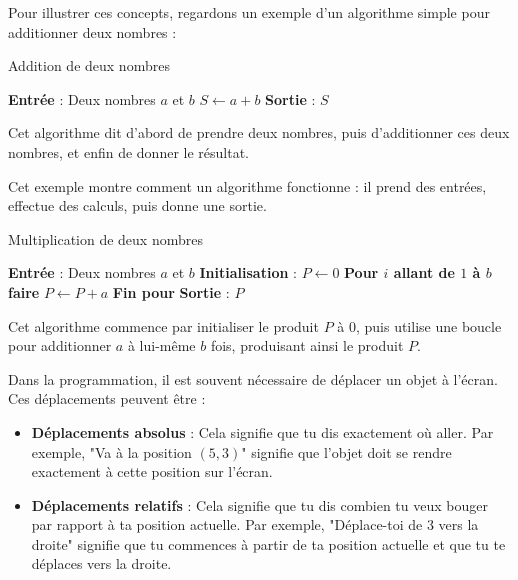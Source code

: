 \documentclass{article}
\begin{document}
Pour illustrer ces concepts, regardons un exemple d'un algorithme simple pour additionner deux nombres :

\begin{tcolorbox}[colback=orange!10!white, colframe=orange!75!black, title=\textcolor{white}{Exemple d'Addition}]
\begin{algorithm}[H]
\caption{Addition de deux nombres}
\begin{algorithmic}[1]
\State \textbf{Entrée} : Deux nombres \( a \) et \( b \)
\State \( S \gets a + b \)
\State \textbf{Sortie} : \( S \)
\end{algorithmic}
\end{algorithm}
Cet algorithme dit d'abord de prendre deux nombres, puis d'additionner ces deux nombres, et enfin de donner le résultat.
\end{tcolorbox}

Cet exemple montre comment un algorithme fonctionne : il prend des entrées, effectue des calculs, puis donne une sortie.


\begin{tcolorbox}[colback=orange!10!white, colframe=orange!75!black, title=\textcolor{white}{Exemple de Multiplication}]
\begin{algorithm}[H]
\caption{Multiplication de deux nombres}
\begin{algorithmic}[1]
\State \textbf{Entrée} : Deux nombres \( a \) et \( b \)
\State \textbf{Initialisation} : \( P \gets 0 \)
\State \textbf{ Pour \( i \) allant de \(1 \) à \( b \)}\textbf{faire}  
    \State \( P \gets P + a \)
\State \textbf{Fin pour}
\State \textbf{Sortie} : \( P \)
\end{algorithmic}
\end{algorithm}
\end{tcolorbox}

Cet algorithme commence par initialiser le produit \( P \) à 0, puis utilise une boucle pour additionner \( a \) à lui-même \( b \) fois, produisant ainsi le produit \( P \).

\vspace{0.15}

Dans la programmation, il est souvent nécessaire de déplacer un objet à l'écran. Ces déplacements peuvent être :

\begin{tcolorbox}[colback=red!10!white, colframe=red!75!black, title=\textcolor{white}{Définitions}]
\begin{itemize}
    \item \textbf{Déplacements absolus} : Cela signifie que tu dis exactement où aller. Par exemple, "Va à la position \( (5, 3) \)" signifie que l'objet doit se rendre exactement à cette position sur l'écran.
    \item \textbf{Déplacements relatifs} : Cela signifie que tu dis combien tu veux bouger par rapport à ta position actuelle. Par exemple, "Déplace-toi de 3 vers la droite" signifie que tu commences à partir de ta position actuelle et que tu te déplaces vers la droite.
\end{itemize}
\end{tcolorbox}
\end{document}
